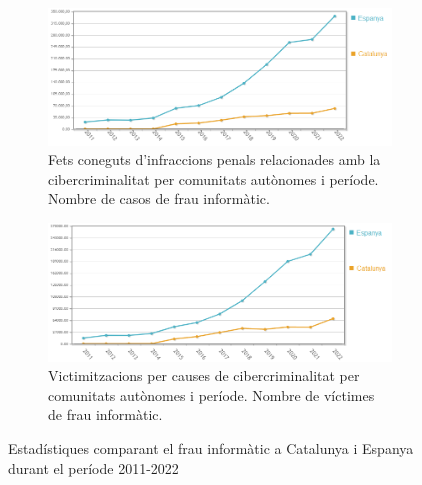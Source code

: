 \begin{figure}[H]
    \centering
    \begin{subfigure}[b]{0.8\textwidth}
      \includegraphics[width=\linewidth]{frau.png}
      \caption{Fets coneguts d'infraccions penals relacionades amb la cibercriminalitat per comunitats autònomes i període. Nombre de casos de frau informàtic.}
      \label{fig:frau}
    \end{subfigure}
  
    \vspace{1em} %
  
    \begin{subfigure}[b]{0.8\textwidth}
      \includegraphics[width=\linewidth]{victimes_frau.png}
      \caption{Victimitzacions per causes de cibercriminalitat per comunitats autònomes i període. Nombre de víctimes de frau informàtic.}
      \label{fig:victimes}
    \end{subfigure}
    
    \caption{Estadístiques comparant el frau informàtic a Catalunya i Espanya durant el període 2011-2022}
    \label{fig:frau_2}
\end{figure}


